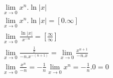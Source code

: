 \begin{ex}
\begin{align}
&\lim_{x\rightarrow 0} x^{n}.\ln{\left|x\right|}\nonumber\\
&\lim_{x\rightarrow 0} x^{n}.\ln{\left|x\right|}= [0.\infty]\nonumber\\
&\lim_{x\rightarrow 0} \frac{\ln{\left|x\right|}}{x^{-n}} = \left[\frac{\infty}{\infty}\right]\nonumber\\
&\lim_{x\rightarrow 0} \frac{\frac{1}{x}}{-n.x^{-(n+1)}}=\lim_{x\rightarrow 0} \frac{x^{n+1}}{-n.x}\nonumber\\
&\lim_{x\rightarrow 0} \frac{x^{n}}{-n}=-\frac{1}{n}\lim_{x\rightarrow 0} x^{n} = -\frac{1}{n}.0=0\nonumber
\end{align}
\end{ex}